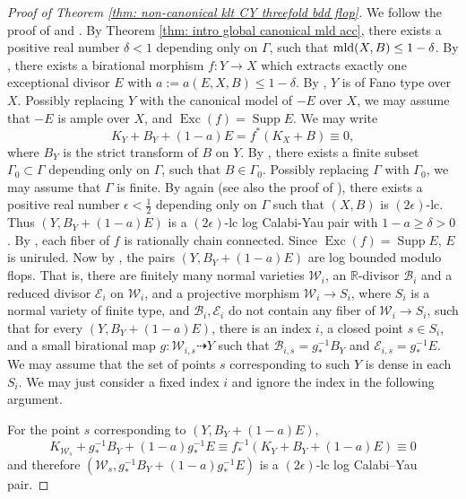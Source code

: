 \documentclass[11pt]{amsart}
\numberwithin{equation}{section}
\newcommand{\Rr}{\mathbb{R}}
\newcommand{\Exc}{\operatorname{Exc}}
\newcommand{\mld}{{\rm{mld}}}
\newcommand{\Supp}{\operatorname{Supp}}
\newcommand{\Ii}{{\Gamma}}
\theoremstyle{definition}
\theoremstyle{definition}
\begin{document}
\begin{proof}[Proof of Theorem \ref{thm: non-canonical klt CY threefold bdd flop}]
We follow the proof of \cite[Theorem 6.1]{Jia21} and \cite[Theorem 5.1]{CDHJS21}. 
By Theorem \ref{thm: intro global canonical mld acc}, there exists a positive real number $\delta<1$ depending only on $\Ii$, such that $\mld(X,B)\le 1-\delta$. By \cite[Corollary 1.4.3]{BCHM10}, there exists a birational morphism $f:Y\to X$ which extracts exactly one exceptional divisor $E$ with $a:=a(E,X,B)\le 1-\delta$. By \cite[Lemma 3.21]{HLS19}, $Y$ is of Fano type over $X$. Possibly replacing $Y$ with the canonical model of $-E$ over $X$, we may assume that $-E$ is ample over $X$, and $\Exc(f)=\Supp E$. We may write
$$K_Y+B_Y+(1-a)E=f^{*}(K_X+B)\equiv 0,$$
where $B_Y$ is the strict transform of $B$ on $Y$. By \cite[Theorem 1.5]{HMX14}, there exists a finite subset $\Ii_0\subset \Ii$ depending only on $\Ii$, such that $B\in\Ii_0$. Possibly replacing $\Ii$ with $\Ii_0$, we may assume that $\Ii$ is finite. By \cite[Theorem 1.5]{HMX14} again (see also the proof of \cite[Lemma 3.12]{CDHJS21}), there exists a positive real number $\epsilon<\frac{1}{2}$ depending only on $\Ii$ such that $(X,B)$ is $(2\epsilon)$-lc. Thus $(Y,B_Y+(1-a)E)$ is a $(2\epsilon)$-lc log Calabi-Yau pair with $1-a\ge \delta>0$. By \cite[Corollary 1.4]{HM07}, each fiber of $f$ is rationally chain connected. Since $\Exc(f)=\Supp E$, $E$ is uniruled. Now by \cite[Proposition 6.4]{Jia21}, the pairs $(Y, B_Y+(1-a)E)$ are log bounded modulo flops. That is, there are finitely many normal varieties $\mathcal{W}_i$, an $\Rr$-divisor $\mathcal{B}_i$ and a reduced divisor $\mathcal{E}_i$ on $\mathcal W_i$, and a projective morphism $\mathcal{W}_i\to S_i$, where $S_i$ is a normal variety of finite type, and $\mathcal{B}_i,\mathcal{E}_i$ do not contain any fiber of $\mathcal{W}_i\to S_i$, such that for every $(Y,B_Y+(1-a)E)$, there is an index $i$, a closed point $s \in S_i$, and a small birational map $g : {\mathcal{W}_{i,s}} \dashrightarrow Y$ such that $\mathcal{B}_{i,s}=g_*^{-1}B_Y$ and $\mathcal{E}_{i,s}=g_*^{-1}E$. We may assume that the set of points $s$ corresponding to such $Y$ is dense in each $S_i$. We may just consider a fixed index $i$ and ignore the index in the following argument.
	
For the point $s$ corresponding to $(Y,B_Y+(1-a)E)$, $$K_{{\mathcal{W}_s}}+g_*^{-1}B_Y+(1-a)g_*^{-1}E\equiv f_*^{-1}(K_Y+B_Y+(1-a)E)\equiv 0$$ and therefore $({\mathcal{W}_s}, g_*^{-1}B_Y+(1-a)g_*^{-1}E)$ is a $(2\epsilon)$-lc log Calabi--Yau pair. 
	

\end{proof}
\end{document}
